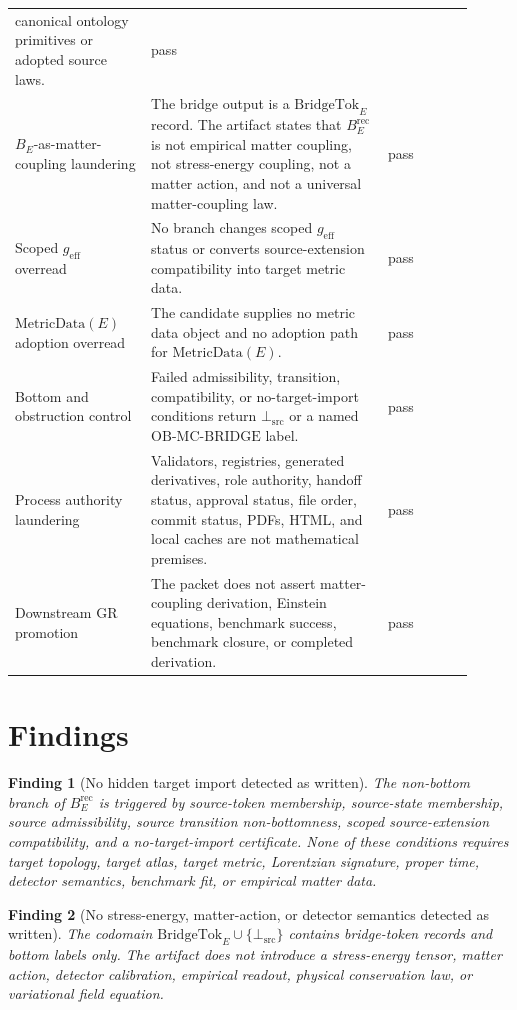 \documentclass[11pt]{article}
\newcommand{\geff}{g_{\mathrm{eff}}}
\newcommand{\MetricData}{\mathrm{MetricData}}
\newcommand{\BottomSrc}{\bot_{\mathrm{src}}}
\newcommand{\BridgeTok}{\mathrm{BridgeTok}}
\newcommand{\OBMCB}{\mathrm{OB}\mbox{-}\mathrm{MC}\mbox{-}\mathrm{BRIDGE}}
\newcommand{\BErec}{B_E^{\mathrm{rec}}}
\newtheorem{finding}{Finding}
\begin{document}
\begin{longtable}{p{0.27\linewidth}p{0.47\linewidth}p{0.17\linewidth}}
canonical ontology primitives or adopted source laws. & pass \\
\addlinespace
\(B_E\)-as-matter-coupling laundering &
The bridge output is a \(\BridgeTok_E\) record. The artifact states that
\(\BErec\) is not empirical matter coupling, not stress-energy coupling, not a
matter action, and not a universal matter-coupling law. & pass \\
\addlinespace
Scoped \(\geff\) overread &
No branch changes scoped \(\geff\) status or converts source-extension
compatibility into target metric data. & pass \\
\addlinespace
\(\MetricData(E)\) adoption overread &
The candidate supplies no metric data object and no adoption path for
\(\MetricData(E)\). & pass \\
\addlinespace
Bottom and obstruction control &
Failed admissibility, transition, compatibility, or no-target-import
conditions return \(\BottomSrc\) or a named \(\OBMCB\) label. & pass \\
\addlinespace
Process authority laundering &
Validators, registries, generated derivatives, role authority, handoff status,
approval status, file order, commit status, PDFs, HTML, and local caches are
not mathematical premises. & pass \\
\addlinespace
Downstream GR promotion &
The packet does not assert matter-coupling derivation, Einstein equations,
benchmark success, benchmark closure, or completed derivation. & pass \\
\bottomrule
\end{longtable}

\section{Findings}

\begin{finding}[No hidden target import detected as written]
The non-bottom branch of \(\BErec\) is triggered by source-token membership,
source-state membership, source admissibility, source transition
non-bottomness, scoped source-extension compatibility, and a no-target-import
certificate. None of these conditions requires target topology, target atlas,
target metric, Lorentzian signature, proper time, detector semantics,
benchmark fit, or empirical matter data.
\end{finding}

\begin{finding}[No stress-energy, matter-action, or detector semantics detected as written]
The codomain \(\BridgeTok_E\cup\{\BottomSrc\}\) contains bridge-token records
and bottom labels only. The artifact does not introduce a stress-energy tensor,
matter action, detector calibration, empirical readout, physical conservation
law, or variational field equation.
\end{finding}
\end{document}

